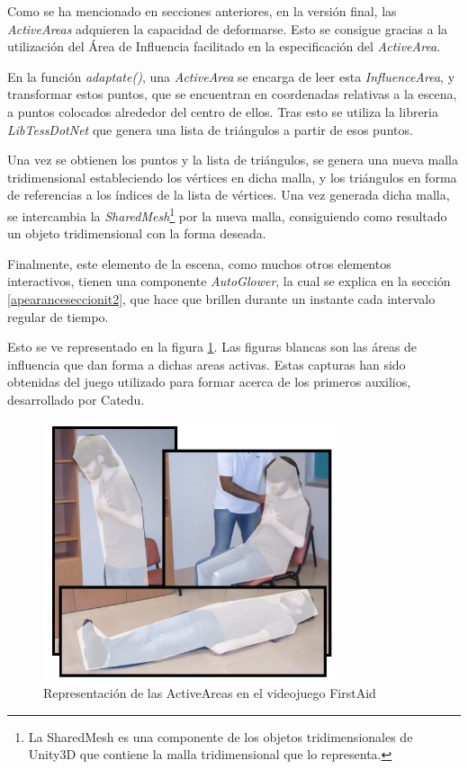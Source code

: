 Como se ha mencionado en secciones anteriores, en la versión final, las \textit{ActiveAreas} adquieren la capacidad de deformarse. Esto se consigue gracias a la utilización del Área de Influencia facilitado en la especificación del \textit{ActiveArea}.

En la función \textit{adaptate()}, una \textit{ActiveArea} se encarga de leer esta \textit{InfluenceArea}, y transformar estos puntos, que se encuentran en coordenadas relativas a la escena, a puntos colocados alrededor del centro de ellos. Tras esto se utiliza la libreria \textit{LibTessDotNet} que genera una lista de triángulos a partir de esos puntos.

Una vez se obtienen los puntos y la lista de triángulos, se genera una nueva malla tridimensional estableciendo los vértices en dicha malla, y los triángulos en forma de referencias a los índices de la lista de vértices. Una vez generada dicha malla, se intercambia la \textit{SharedMesh}\footnote{La SharedMesh es una componente de los objetos tridimensionales de Unity3D que contiene la malla tridimensional que lo representa.} por la nueva malla, consiguiendo como resultado un objeto tridimensional con la forma deseada.

Finalmente, este elemento de la escena, como muchos otros elementos interactivos, tienen una componente \textit{AutoGlower}, la cual se explica en la sección \ref{apearanceseccionit2}, que hace que brillen durante un instante cada intervalo regular de tiempo.

Esto se ve representado en la figura \ref{activeareasit2}. Las figuras blancas son las áreas de influencia que dan forma a dichas areas activas. Estas capturas han sido obtenidas del juego utilizado para formar acerca de los primeros auxilios, desarrollado por Catedu.

\begin{figure}[h!]
	\centerline{\includegraphics[height=3in]{figures/it2/Apearance/ActiveAreas.png}}
	\caption[ActiveAreas - Versión Final]{Representación de las ActiveAreas en el videojuego FirstAid}
	\label{activeareasit2}
\end{figure}


